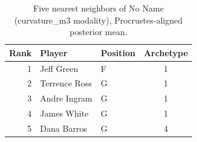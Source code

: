 \begin{table}[htbp]
  \centering\small
  \begin{tabular}{rllc}
    \toprule
    Rank & Player & Position & Archetype \\
    \midrule
    1 & Jeff Green & F & 1 \\
    2 & Terrence Ross & G & 1 \\
    3 & Andre Ingram & G & 1 \\
    4 & James White & G & 1 \\
    5 & Dana Barros & G & 4 \\
    \bottomrule
  \end{tabular}
  \caption{Five nearest neighbors of No Name (curvature_m3 modality), Procrustes-aligned posterior mean.}
  \label{tab:No_Name_neighbors_curvature_m3}
\end{table}

